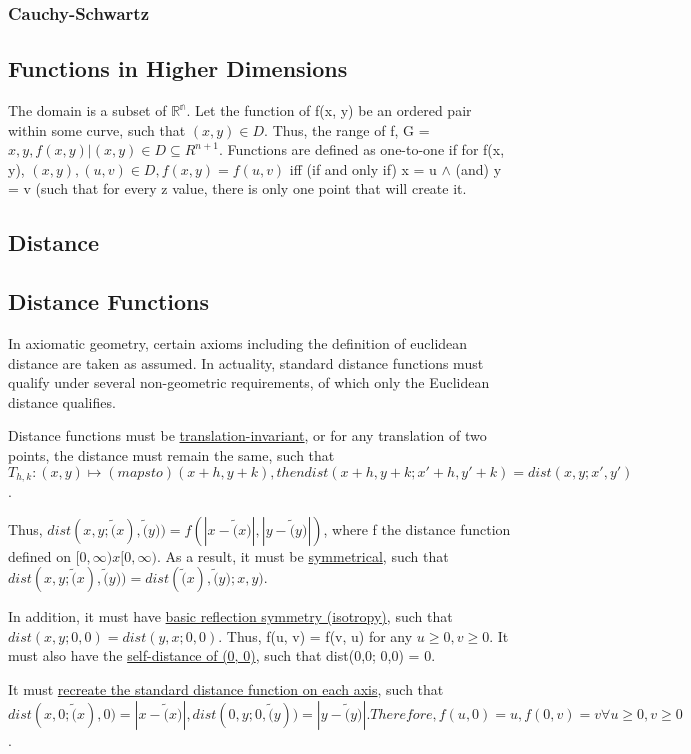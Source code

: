 \documentclass[11 pt, twoside]{article}
\begin{document}
\subsubsection{Cauchy-Schwartz}


\subsection{Functions in Higher Dimensions}
The domain is a subset of $\mathbb{R^n}$.
Let the function of f(x, y) be an ordered pair within some curve, such that $(x, y) \in D$. Thus, the range of f, G = ${x, y, f(x,y) | (x, y) \in D} \subseteq{R^{n+1}}$.
Functions are defined as one-to-one if for f(x, y), $(x, y), (u, v) \in D, f(x, y) = f(u, v)$ iff (if and only if) x = u $\wedge$ (and) y = v (such that for every z value, there is only one point that will create it.

\subsection{Distance}
\subsection{Distance Functions}
In axiomatic geometry, certain axioms including the definition of euclidean distance are taken as assumed. In actuality, standard distance functions must qualify under several non-geometric requirements, of which only the Euclidean distance qualifies.

Distance functions must be \underline{translation-invariant}, or for any translation of two points, the distance must remain the same, such that $T_{h, k}: (x, y) \mapsto (maps to) (x+h, y+k), then dist(x+h, y+k; x'+h, y'+k) = dist(x, y; x', y')$. 

Thus, $dist(x,y; \tilde(x), \tilde(y)) = f(|x-\tilde(x)|, |y-\tilde(y)|)$, where f the distance function defined on $[0, \infty) x [0, \infty).$ As a result, it must be \underline{symmetrical}, such that $dist(x, y; \tilde(x), \tilde(y)) = dist(\tilde(x), \tilde(y); x, y)$.

In addition, it must have \underline{basic reflection symmetry (isotropy)}, such that $dist(x, y; 0, 0) = dist(y, x; 0, 0)$. Thus, f(u, v) = f(v, u) for any $u \geq 0, v \geq 0$. It must also have the \underline{self-distance of (0, 0)}, such that dist(0,0; 0,0) = 0.

It must \underline{recreate the standard distance function on each axis}, such that $dist(x,0; \tilde(x), 0) = |x - \tilde(x)|, dist(0, y; 0, \tilde(y)) = |y - \tilde(y)|. Therefore, f(u, 0) = u, f(0, v) = v \forall u \geq 0, v \geq 0$.
\end{document}
